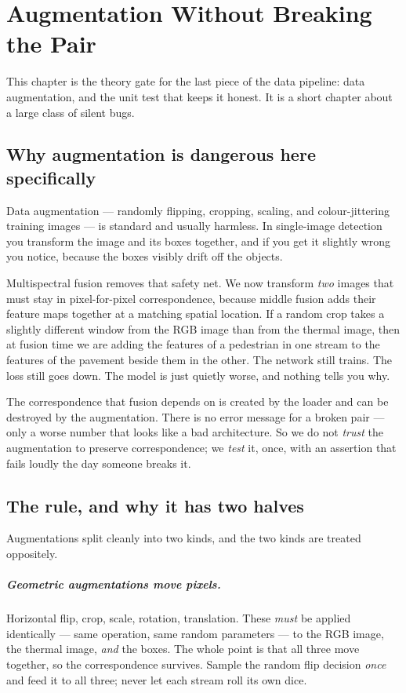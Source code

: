 \documentclass[../main.tex]{subfiles}
\begin{document}
\chapter{Augmentation Without Breaking the Pair}

This chapter is the theory gate for the last piece of the data pipeline: data augmentation,
and the unit test that keeps it honest. It is a short chapter about a large class of silent
bugs.

\section{Why augmentation is dangerous here specifically}

Data augmentation --- randomly flipping, cropping, scaling, and colour-jittering training
images --- is standard and usually harmless. In single-image detection you transform the image
and its boxes together, and if you get it slightly wrong you notice, because the boxes visibly
drift off the objects.

Multispectral fusion removes that safety net. We now transform \emph{two} images that must stay
in pixel-for-pixel correspondence, because middle fusion adds their feature maps together at a
matching spatial location. If a random crop takes a slightly different window from the RGB image
than from the thermal image, then at fusion time we are adding the features of a pedestrian in
one stream to the features of the pavement beside them in the other. The network still trains.
The loss still goes down. The model is just quietly worse, and nothing tells you why.

\begin{lesson}
The correspondence that fusion depends on is created by the loader and can be destroyed by the
augmentation. There is no error message for a broken pair --- only a worse number that looks like
a bad architecture. So we do not \emph{trust} the augmentation to preserve correspondence; we
\emph{test} it, once, with an assertion that fails loudly the day someone breaks it.
\end{lesson}

\section{The rule, and why it has two halves}

Augmentations split cleanly into two kinds, and the two kinds are treated oppositely.

\paragraph{Geometric augmentations move pixels.} Horizontal flip, crop, scale, rotation,
translation. These \emph{must} be applied identically --- same operation, same random parameters
--- to the RGB image, the thermal image, \emph{and} the boxes. The whole point is that all three
move together, so the correspondence survives. Sample the random flip decision \emph{once} and
feed it to all three; never let each stream roll its own dice.
\end{document}
